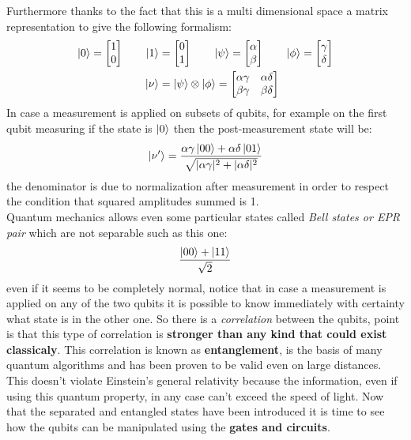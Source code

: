Furthermore thanks to the fact that this is a multi dimensional space a matrix representation to give the following formalism:
\begin{align*}
	\ket{0} =   
	\begin{bmatrix}
		1 \\
		0
	\end{bmatrix}
	\qquad
	\ket{1} &=
	\begin{bmatrix}
		0 \\
		1
	\end{bmatrix}
	\qquad
	\ket{\psi} =
	\begin{bmatrix}
		\alpha \\
		\beta
	\end{bmatrix}
	\qquad
	\ket{\phi} =
	\begin{bmatrix}
		\gamma \\
		\delta
	\end{bmatrix}\\
	\ket{\nu} &= \ket{\psi} \otimes \ket{\phi} = 
	\begin{bmatrix}
		\alpha\gamma & \alpha\delta\\
		\beta\gamma  & \beta\delta
	\end{bmatrix}
\end{align*}
In case a measurement is applied on subsets of qubits, for example on the first qubit measuring if the state is $\ket{0}$ then the post-measurement state will be:
\begin{equation}\label{post measurement}
	\ket{\nu'} = \frac{\alpha\gamma\ket{00} + \alpha\delta \ket{01}}{\sqrt{|\alpha\gamma|^2 + |\alpha\delta|^2}}
\end{equation}
the denominator is due to normalization after measurement in order to respect the condition that squared amplitudes summed is 1.\\
Quantum mechanics allows even some particular states called \textit{Bell states or EPR pair} which are not separable such as this one:
\begin{equation}\label{bell state}
	\frac{\ket{00} + \ket{11}}{\sqrt{2}}
\end{equation}
even if it seems to be completely normal, notice that in case a measurement is applied on any of the two qubits it is possible to know immediately with certainty what state is in the other one. So there is a \textit{correlation} between the qubits, point is that this type of correlation is \textbf{stronger than any kind that could exist classicaly}. This correlation is known as \textbf{entanglement}, is the basis of many quantum algorithms and has been proven to be valid even on large distances. This doesn't violate Einstein's general relativity because the information, even if using this quantum property, in any case can't exceed the speed of light. Now that the separated and entangled states have been introduced it is time to see how the qubits can be manipulated using the \textbf{gates and circuits}.
